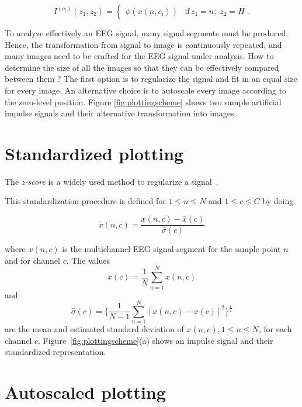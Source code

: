 \begin{enumerate}
\begin{equation}
I^{(c_i)}(z_1,z_2) = \left\{ \begin{array}{rl} \phi(x(n,c_i))  & \text{if} \,  z_1 = n; \; z_2 = H \end{array}\right. .
\label{eq:image6}
\end{equation}


\end{enumerate}


To analyze effectively an EEG signal, many signal segments must be produced.  Hence, the transformation from signal to image is continuously repeated, and many images need to be crafted for the EEG signal under analysis.  How to determine the size of all the images so that they can be effectively compared between them ?  The first option is to regularize the signal and fit in an equal size for every image.  An alternative choice is to autoscale every image according to the zero-level position.  Figure \ref{fig:plottingscheme} shows two sample artificial impulse signals and their  alternative transformation into images.

\section{Standardized plotting}
\label{standardized}

The \textit{z-score} is a widely used method to regularize a signal~\cite{Zhang2013}.

This standardization procedure is defined for  $1 \leq n \leq N$ and $1 \leq c \leq C$ by doing

\begin{equation}
\tilde{x}(n,c) =  \frac{ x(n,c) - \bar{x}(c) }{ \hat{\sigma}(c) } 
\label{eq:standarizedaverages}
\end{equation}

\noindent  where $ x(n,c) $ is the multichannel EEG signal segment for the sample point $n$ and for channel $c$. The values $$\bar{x}(c) =\frac{1}{N}\sum_{n=1}^{N}x(n,c)$$ and $$ \hat{\sigma}(c) =   \bigg \{ \frac{1}{N-1}\sum_{n=1}^{N} { \left[ x(n,c)-\bar{x}(c) \right]  }^2 \bigg \}^{\frac{1}{2}}$$ are the mean and estimated standard deviation of $x(n,c), 1 \leq n \leq N$, for each channel $c$. Figure~\ref{fig:plottingscheme}(a) shows an impulse signal and their standardized representation.

\section{Autoscaled plotting}
\label{autoscaled}


